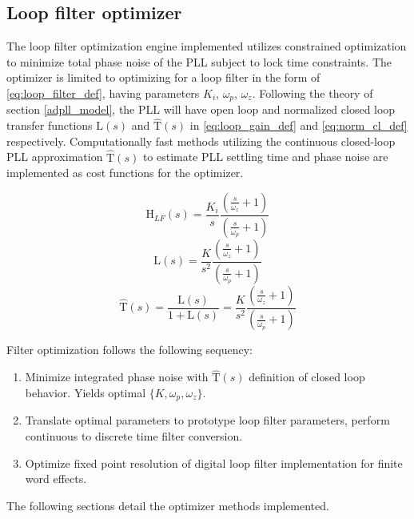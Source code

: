 \subsection{Loop filter optimizer}
The loop filter optimization engine implemented utilizes constrained optimization to minimize total phase noise of the PLL subject to lock time constraints. The optimizer is limited to optimizing for a loop filter in the form of \ref{eq:loop_filter_def}, having parameters $K_i$, $\omega_p$, $\omega_z$. Following the theory of section \ref{adpll_model}, the PLL will have open loop and normalized closed loop transfer functions $\mathrm{L}(s)$ and $\mathrm{\hat{T}}(s)$ in \ref{eq:loop_gain_def} and \ref{eq:norm_cl_def} respectively.  Computationally fast methods utilizing the continuous closed-loop PLL approximation $\mathrm{\hat{T}}(s)$ to estimate PLL settling time and phase noise are implemented as cost functions for the optimizer.

	\begin{equation}\label{eq:loop_filter_def}
	\mathrm{H}_{LF}(s) = \frac{K_i}{s}\frac{(\frac{s}{\omega_z}+1)}{(\frac{s}{\omega_p}+1)}
	\end{equation}
	\begin{equation}\label{eq:loop_gain_def}
	\mathrm{L}(s) = \frac{K}{s^2}\frac{(\frac{s}{\omega_z}+1)}{(\frac{s}{\omega_p}+1)}
	\end{equation}
	\begin{equation}\label{eq:norm_cl_def}
	\mathrm{\hat{T}}(s) = \frac{\mathrm{L}(s)}{1+\mathrm{L}(s)} = \frac{K}{s^2}\frac{(\frac{s}{\omega_z}+1)}{(\frac{s}{\omega_p}+1)}
	\end{equation}

Filter optimization follows the following sequency:
\begin{enumerate}
	\setlength\itemsep{-0.8em}
	\item Minimize integrated phase noise with $\mathrm{\hat{T}}(s)$ definition of closed loop behavior. Yields optimal $\{K, \omega_p, \omega_z\}$.
	\item Translate optimal parameters to prototype loop filter parameters, perform continuous to discrete time filter conversion.
	\item Optimize fixed point resolution of digital loop filter implementation for finite word effects.
\end{enumerate}

The following sections detail the optimizer methods implemented.

